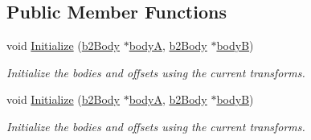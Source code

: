 \subsection*{Public Member Functions}
\begin{DoxyCompactItemize}
\item 
\mbox{\label{structb2MotorJointDef_a90eb924b6e04da8d75d9cefad0655960}} 
void \hyperlink{structb2MotorJointDef_a90eb924b6e04da8d75d9cefad0655960}{Initialize} (\hyperlink{classb2Body}{b2\+Body} $\ast$\hyperlink{structb2JointDef_a592b8e186f5f0d8848ef6b7ce77f0f70}{bodyA}, \hyperlink{classb2Body}{b2\+Body} $\ast$\hyperlink{structb2JointDef_a3d1a39831332b8c5a41611c06396480a}{bodyB})
\begin{DoxyCompactList}\small\item\em Initialize the bodies and offsets using the current transforms. \end{DoxyCompactList}\item 
\mbox{\label{structb2MotorJointDef_a90eb924b6e04da8d75d9cefad0655960}} 
void \hyperlink{structb2MotorJointDef_a90eb924b6e04da8d75d9cefad0655960}{Initialize} (\hyperlink{classb2Body}{b2\+Body} $\ast$\hyperlink{structb2JointDef_a592b8e186f5f0d8848ef6b7ce77f0f70}{bodyA}, \hyperlink{classb2Body}{b2\+Body} $\ast$\hyperlink{structb2JointDef_a3d1a39831332b8c5a41611c06396480a}{bodyB})
\begin{DoxyCompactList}\small\item\em Initialize the bodies and offsets using the current transforms. \end{DoxyCompactList}\end{DoxyCompactItemize}
